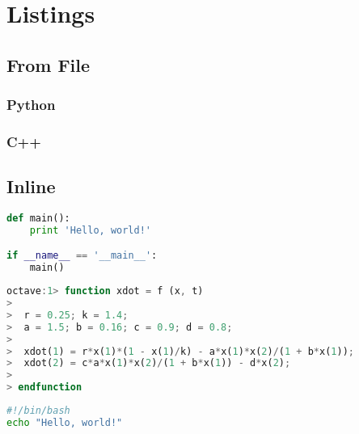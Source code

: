 \chapter{Listings}
\label{ch:listings}

\section{From File}

\subsection{Python}


\subsection{C++}


\section{Inline}
\begin{lstlisting}[language=python, caption={python main}]
def main():
	print 'Hello, world!'

if __name__ == '__main__':
	main()
\end{lstlisting}

\newpage

\begin{lstlisting}[language=octave, caption={octave example}]
octave:1> function xdot = f (x, t)
>
>  r = 0.25; k = 1.4;
>  a = 1.5; b = 0.16; c = 0.9; d = 0.8;
>
>  xdot(1) = r*x(1)*(1 - x(1)/k) - a*x(1)*x(2)/(1 + b*x(1));
>  xdot(2) = c*a*x(1)*x(2)/(1 + b*x(1)) - d*x(2);
>
> endfunction
\end{lstlisting}

\begin{lstlisting}[language=bash,caption={bash code}]
#!/bin/bash
echo "Hello, world!"
\end{lstlisting}